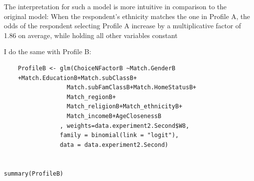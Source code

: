 \documentclass{article}
\begin{document}
The interpretation for such a model is more intuitive in comparison to the original model:
When the respondent’s ethnicity matches the one in Profile A, the odds of the respondent selecting Profile A increase by a multiplicative factor of 1.86 on average, while holding all other variables constant


I do the same with Profile B:
\begin{verbatim}
    ProfileB <- glm(ChoiceNFactorB ~Match.GenderB 
    +Match.EducationB+Match.subClassB+
                  Match.subFamClassB+Match.HomeStatusB+
                  Match_regionB+  
                  Match_religionB+Match_ethnicityB+
                  Match_incomeB+AgeClosenessB
                , weights=data.experiment2.Second$W8,
                family = binomial(link = "logit"),
                data = data.experiment2.Second)


summary(ProfileB)

\end{verbatim}
\end{document}
